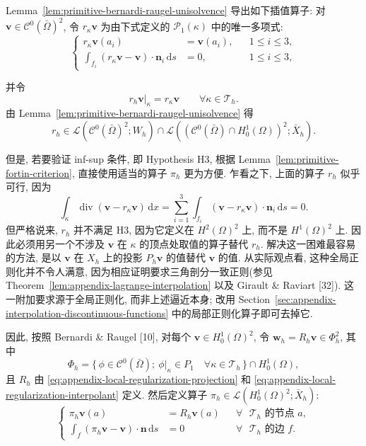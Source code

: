 Lemma~\ref{lem:primitive-bernardi-raugel-unisolvence} 导出如下插值算子:
对 $\mathbf v\in\mathcal{C}^0(\bar\Omega)^2$, 令
$r_\kappa\mathbf v$ 为由下式定义的
$\mathcal{P}_1(\kappa)$ 中的唯一多项式:
\begin{equation}\label{eq:primitive-bernardi-raugel-local-interpolant}
\left\{
\begin{aligned}
r_\kappa\mathbf v(a_i)&=\mathbf v(a_i),&&1\leq i\leq3,\\
\int_{f_i}(r_\kappa\mathbf v-\mathbf v)\cdot\mathbf n_i\,\mathrm ds&=0,
&&1\leq i\leq3,
\end{aligned}
\right.
\end{equation}

并令
\[
r_h\mathbf v|_\kappa=r_\kappa\mathbf v
\qquad\forall\kappa\in\mathcal{T}_h.
\]
由 Lemma~\ref{lem:primitive-bernardi-raugel-unisolvence} 得
\[
r_h\in
\mathcal{L}(\mathcal{C}^0(\bar\Omega)^2;W_h)
\cap
\mathcal{L}((\mathcal{C}^0(\bar\Omega)\cap H_0^1(\Omega))^2;\bar X_h).
\]

但是, 若要验证 inf-sup 条件, 即 Hypothesis H3, 根据
Lemma~\ref{lem:primitive-fortin-criterion}, 直接使用适当的算子 $\pi_h$
更为方便. 乍看之下, 上面的算子 $r_h$ 似乎可行, 因为
\[
\int_\kappa\operatorname{div}(\mathbf v-r_\kappa\mathbf v)\,\mathrm dx
=\sum_{i=1}^3\int_{f_i}(\mathbf v-r_\kappa\mathbf v)
\cdot\mathbf n_i\,\mathrm ds=0.
\]
但严格说来, $r_h$ 并不满足 H3, 因为它定义在 $H^2(\Omega)^2$ 上,
而不是 $H^1(\Omega)^2$ 上. 因此必须用另一个不涉及 $\mathbf v$
在 $\kappa$ 的顶点处取值的算子替代 $r_h$. 解决这一困难最容易的方法,
是以 $\mathbf v$ 在 $X_h$ 上的投影 $P_h\mathbf v$ 的值替代
$\mathbf v$ 的值. 从实际观点看, 这种全局正则化并不令人满意,
因为相应证明要求三角剖分一致正则(参见 Theorem~\ref{lem:appendix-lagrange-interpolation}
以及 Girault \& Raviart [32]). 这一附加要求源于全局正则化,
而非上述逼近本身; 改用 Section~\ref{sec:appendix-interpolation-discontinuous-functions}
中的局部正则化算子即可去掉它.

因此, 按照 Bernardi \& Raugel [10], 对每个
$\mathbf v\in H_0^1(\Omega)^2$, 令 $\mathbf w_h=R_h\mathbf v\in\Phi_h^2$,
其中
\[
\Phi_h=\{\,\phi\in\mathcal{C}^0(\bar\Omega);
\ \phi|_\kappa\in P_1\quad\forall\kappa\in\mathcal{T}_h\,\}
\cap H_0^1(\Omega),
\]
且 $R_h$ 由 
\eqref{eq:appendix-local-regularization-projection} 和
\eqref{eq:appendix-local-regularization-interpolant} 定义. 然后定义算子
$\pi_h\in\mathcal{L}(H_0^1(\Omega)^2;\bar X_h)$:
\begin{equation}\label{eq:primitive-bernardi-raugel-fortin-operator}
\left\{
\begin{aligned}
\pi_h\mathbf v(a)&=R_h\mathbf v(a)
&&\forall\text{ $\mathcal{T}_h$ 的节点 }a,\\
\int_f(\pi_h\mathbf v-\mathbf v)\cdot\mathbf n\,\mathrm ds&=0
&&\forall\text{ $\mathcal{T}_h$ 的边 }f.
\end{aligned}
\right.
\end{equation}

